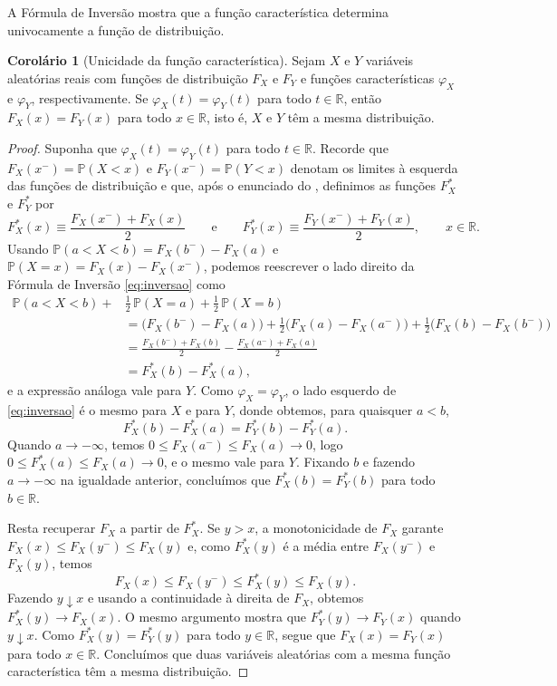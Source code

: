 \documentclass[12pt,portuguese]{article}
\theoremstyle{definition}
\newtheorem{corollary}[corollary]{Corolário}
\theoremstyle{plainexercise}
\theoremstyle{starredexercise}
\theoremstyle{definition}
\begin{document}
\medskip

A Fórmula de Inversão mostra que a função característica determina univocamente
a função de distribuição.

\begin{corollary}[Unicidade da função característica]\label{cor:unicidade}
Sejam $X$ e $Y$ variáveis aleatórias reais com funções de distribuição $F_X$ e
$F_Y$ e funções características $\varphi_X$ e $\varphi_Y$, respectivamente. Se
$\varphi_X(t)=\varphi_Y(t)$ para todo $t\in\mathbb{R}$, então
$F_X(x)=F_Y(x)$ para todo $x\in\mathbb{R}$, isto é, $X$ e $Y$ têm a mesma
distribuição.
\end{corollary}

\begin{proof}
Suponha que $\varphi_X(t)=\varphi_Y(t)$ para todo $t\in\mathbb{R}$. Recorde que $F_X(x^-)=\mathbb{P}(X<x)$ e $F_Y(x^-)=\mathbb{P}(Y<x)$ denotam os
limites à esquerda das funções de distribuição e que, após o enunciado do
, definimos as funções $F_X^*$ e $F_Y^*$ por
\[
F_X^*(x)\equiv\frac{F_X(x^-)+F_X(x)}{2}
\qquad\text{e}\qquad
F_Y^*(x)\equiv\frac{F_Y(x^-)+F_Y(x)}{2},
\qquad x\in\mathbb{R}.
\]
Usando $\mathbb{P}(a<X<b)=F_X(b^-)-F_X(a)$ e $\mathbb{P}(X=x)=F_X(x)-F_X(x^-)$,
podemos reescrever o lado direito da Fórmula de Inversão \eqref{eq:inversao} como
\begin{align*}
\mathbb{P}(a<X<b)+&\frac{1}{2}\,\mathbb{P}(X=a)+\frac{1}{2}\,\mathbb{P}(X=b)\\
&=\big(F_X(b^-)-F_X(a)\big)+\frac{1}{2}\big(F_X(a)-F_X(a^-)\big)
+\frac{1}{2}\big(F_X(b)-F_X(b^-)\big)\\[0.3cm]
&=\frac{F_X(b^-)+F_X(b)}{2}-\frac{F_X(a^-)+F_X(a)}{2}
\\[0.3cm]
&=
F_X^*(b)-F_X^*(a),
\end{align*}
e a expressão análoga vale para $Y$. Como $\varphi_X=\varphi_Y$, o lado esquerdo
de \eqref{eq:inversao} é o mesmo para $X$ e para $Y$, donde obtemos, para
quaisquer $a<b$,
\[
F_X^*(b)-F_X^*(a)=F_Y^*(b)-F_Y^*(a).
\]
Quando $a\to-\infty$, temos $0\leqslant F_X(a^-)\leqslant F_X(a)\to0$, logo
$0\leqslant F_X^*(a)\leqslant F_X(a)\to0$, e o mesmo vale para $Y$. Fixando
$b$ e fazendo $a\to-\infty$ na igualdade anterior, concluímos que
$F_X^*(b)=F_Y^*(b)$ para todo $b\in\mathbb{R}$.

Resta recuperar $F_X$ a partir de $F_X^*$. Se $y>x$, a monotonicidade de $F_X$
garante $F_X(x)\leqslant F_X(y^-)\leqslant F_X(y)$ e, como $F_X^*(y)$ é a média
entre $F_X(y^-)$ e $F_X(y)$, temos
\[
F_X(x)\leqslant F_X(y^-)\leqslant F_X^*(y)\leqslant F_X(y).
\]
Fazendo $y\downarrow x$ e usando a continuidade à direita de $F_X$, obtemos
$F_X^*(y)\to F_X(x)$. O mesmo argumento mostra que $F_Y^*(y)\to F_Y(x)$ quando
$y\downarrow x$. Como $F_X^*(y)=F_Y^*(y)$ para todo $y\in\mathbb{R}$, segue que
$F_X(x)=F_Y(x)$ para todo $x\in\mathbb{R}$. Concluímos que duas variáveis
aleatórias com a mesma função característica têm a mesma distribuição.
\end{proof}
\end{document}

